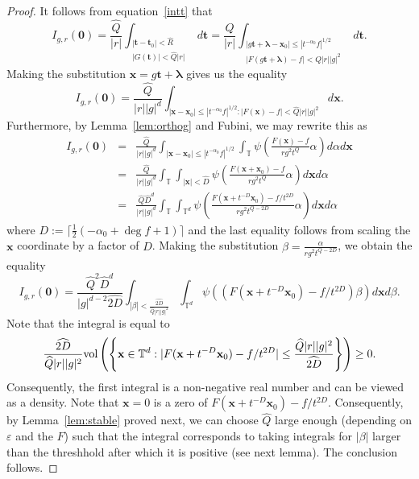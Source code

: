 \documentclass[11pt]{amsart}
\theoremstyle{plain}
\theoremstyle{plain}
\renewcommand{\vec}[1]{\mathbf{#1}}
\theoremstyle{remark}
\theoremstyle{definition}
\renewcommand{\hat}{\widehat}
\newcommand{\hQ}{\widehat{Q}}
\newcommand{\TT}{\mathbb{T}}
\newcommand{\vol}{\textup{vol}}
\begin{document}
\begin{proof}
It follows from equation~\ref{intt} that
\[I_{g,r}(\vec{0})=\frac{\hQ}{|r|} \int_{\substack{|\vec{t}-\vec{t}_0|< \hat{R}\\ |G(\vec{t})|< \hQ|r|}} d\vec{t}=\frac{\hQ}{|r|} \int_{\substack{|g\vec{t}+\boldsymbol{\lambda}-\vec{x}_0| \leq |t^{-\alpha_0}f|^{1/2}\\ |F(g\vec{t}+\boldsymbol{\lambda})-f|<\hQ|r||g|^2}} d\vec{t}.\]
Making the substitution $\vec{x}=g\vec{t}+\boldsymbol{\lambda}$ gives us the equality
\[I_{g,r}(\vec{0})=\frac{\hQ}{|r||g|^d}\int_{|\vec{x}-\vec{x}_0|\leq |t^{-\alpha_0}f|^{1/2}:|F(\vec{x})-f|< \hQ|r||g|^2}d\vec{x}.\]
Furthermore, by Lemma~\ref{lem:orthog} and Fubini, we may rewrite this as
\begin{eqnarray*}I_{g,r}(\vec{0})&=&\frac{\hQ}{|r||g|^d}\int_{|\vec{x}-\vec{x}_0|\leq |t^{-\alpha_0}f|^{1/2}}\int_{\TT}\psi\left(\frac{F(\vec{x})-f}{rg^2t^{Q}}\alpha\right)d\alpha d\vec{x}\\ &=&\frac{\hQ}{|r||g|^d}\int_{\TT}\int_{|\vec{x}|< \hat{D}}\psi\left(\frac{F(\vec{x}+\vec{x}_0)-f}{rg^2t^Q}\alpha\right)d\vec{x}d\alpha\\ &=& \frac{\hQ\hat{D}^d}{|r||g|^d}\int_{\TT}\int_{\TT^d}\psi\left(\frac{F(\vec{x}+t^{-D}\vec{x}_0)-f/t^{2D}}{rg^2t^{Q-2D}}\alpha\right)d\vec{x}d\alpha
\end{eqnarray*}
where $D:=\lceil\frac{1}{2}(-\alpha_0+\deg f+1)\rceil$ and the last equality follows from scaling the $\vec{x}$ coordinate by a factor of $\hat{D}$. Making the substitution $\beta=\frac{\alpha}{rg^2t^{Q-2D}}$, we obtain the equality
\[I_{g,r}(\vec{0})=\frac{\hQ^2\hat{D}^d}{|g|^{d-2}\hat{2D}}\int_{|\beta|<\frac{\hat{2D}}{\hQ|r||g|^2}}\int_{\TT^d}\psi\left((F(\vec{x}+t^{-D}\vec{x}_0)-f/t^{2D})\beta\right)d\vec{x}d\beta.\]
Note that the integral is equal to
\begin{eqnarray*}\frac{\hat{2D}}{\hQ|r||g|^2}\vol\left(\left\{\vec{x}\in\TT^d:|F(\vec{x}+t^{-D}\vec{x}_0)-f/t^{2D}|\leq \frac{\hQ|r||g|^2}{\hat{2D}}\right\}\right)\geq 0.
\end{eqnarray*}
Consequently, the first integral is a non-negative real number and can be viewed as a density. Note that $\vec{x}=0$ is a zero of $F(\vec{x}+t^{-D}\vec{x}_0)-f/t^{2D}$. Consequently, by Lemma~\ref{lem:stable} proved next, we can choose $\hQ$ large enough (depending on $\varepsilon$ and the $F$) such that the integral corresponds to taking integrals for $|\beta|$ larger than the threshhold after which it is positive (see next lemma). The conclusion follows.

\end{proof}
\end{document}
